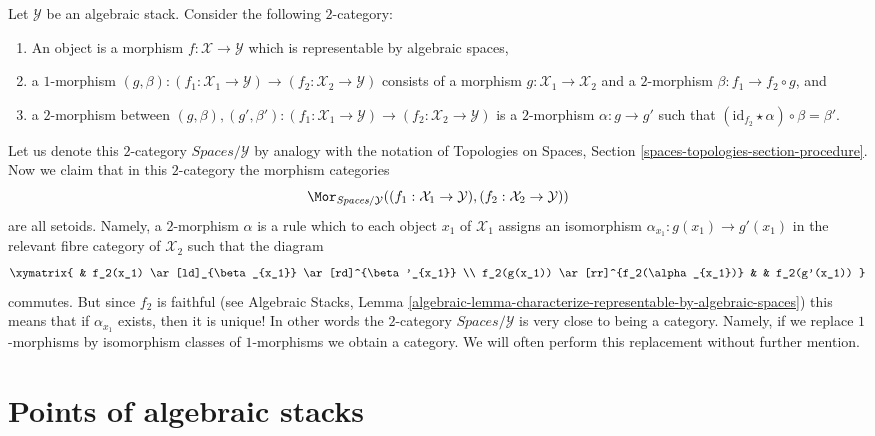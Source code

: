 \begin{remark}
\label{remark-representable-over}
Let $\mathcal{Y}$ be an algebraic stack. Consider the following
$2$-category:
\begin{enumerate}
\item An object is a morphism $f : \mathcal{X} \to \mathcal{Y}$
which is representable by algebraic spaces,
\item a $1$-morphism
$(g, \beta) :
(f_1 : \mathcal{X}_1 \to \mathcal{Y})
\to
(f_2 : \mathcal{X}_2 \to \mathcal{Y})$
consists of a morphism $g : \mathcal{X}_1 \to \mathcal{X}_2$ and a
$2$-morphism $\beta : f_1 \to f_2 \circ g$, and
\item a $2$-morphism between
$(g, \beta), (g', \beta') :
(f_1 : \mathcal{X}_1 \to \mathcal{Y})
\to
(f_2 : \mathcal{X}_2 \to \mathcal{Y})$
is a $2$-morphism $\alpha : g \to g'$ such that
$(\text{id}_{f_2} \star \alpha) \circ \beta = \beta'$.
\end{enumerate}
Let us denote this $2$-category $\textit{Spaces}/\mathcal{Y}$ by
analogy with the notation of
Topologies on Spaces, Section \ref{spaces-topologies-section-procedure}.
Now we claim that in this $2$-category the morphism categories
$$
\Mor_{\textit{Spaces}/\mathcal{Y}}(
(f_1 : \mathcal{X}_1 \to \mathcal{Y}),
(f_2 : \mathcal{X}_2 \to \mathcal{Y}))
$$
are all setoids. Namely, a $2$-morphism $\alpha$ is a rule which to each
object $x_1$ of $\mathcal{X}_1$ assigns an isomorphism
$\alpha_{x_1} : g(x_1) \longrightarrow g'(x_1)$
in the relevant fibre category of $\mathcal{X}_2$ such that the diagram
$$
\xymatrix{
& f_2(x_1) \ar[ld]_{\beta_{x_1}} \ar[rd]^{\beta'_{x_1}} \\
f_2(g(x_1)) \ar[rr]^{f_2(\alpha_{x_1})} & &
f_2(g'(x_1))
}
$$
commutes. But since $f_2$ is faithful (see
Algebraic Stacks,
Lemma \ref{algebraic-lemma-characterize-representable-by-algebraic-spaces})
this means that if $\alpha_{x_1}$ exists, then it is unique! In other words the
$2$-category $\textit{Spaces}/\mathcal{Y}$ is very close to
being a category. Namely, if we replace $1$-morphisms by isomorphism
classes of $1$-morphisms we obtain a category. We will often
perform this replacement without further mention.
\end{remark}




\section{Points of algebraic stacks}
\label{section-points}

